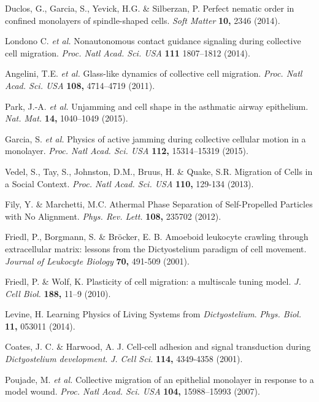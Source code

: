 \documentclass[11pt, twocolumn]{article}
\begin{document}
\begin{thebibliography}{10}
Duclos, G., Garcia, S., Yevick, H.G. \& Silberzan, P. Perfect nematic order in confined monolayers of spindle-shaped cells.
 {\em Soft Matter} \textbf{10,} 2346 (2014).

Londono C. \textit{et al.} Nonautonomous contact guidance signaling during collective cell migration.
 {\em Proc. Natl Acad. Sci. USA} \textbf{111} 1807--1812 (2014).

Angelini, T.E. \textit{et al.} Glass-like dynamics of collective cell migration.
 {\em Proc. Natl Acad.
Sci. USA} \textbf{108,} 4714--4719 (2011).
 
Park, J.-A. \textit{et al.} Unjamming and cell shape in the asthmatic airway epithelium.
 {\em Nat. Mat.} \textbf{14,} 1040--1049 (2015).

Garcia, S. \textit{et al.} Physics of active jamming during collective cellular motion in a monolayer.
 {\em Proc. Natl Acad. Sci. USA} \textbf{112,} 15314--15319 (2015).

Vedel, S., Tay, S., Johnston, D.M., Bruus, H. \& Quake, S.R. Migration of Cells in a Social Context.
 \emph{Proc. Natl Acad. Sci. USA} \textbf{110,} 129-134 (2013).

Fily, Y. \& Marchetti, M.C. Athermal Phase Separation of Self-Propelled Particles with No Alignment.
 \emph{Phys. Rev. Lett.} \textbf{108,} 235702 (2012).

Friedl, P., Borgmann, S. \& Br\"ocker, E. B. Amoeboid leukocyte crawling through extracellular matrix: lessons from the Dictyostelium paradigm of cell movement.
 {\em Journal of Leukocyte Biology} \textbf{70,} 491-509 (2001). 

Friedl, P. \& Wolf, K. Plasticity of cell migration: a multiscale tuning model. {\em J. Cell Biol.} \textbf{188,} 11--9 (2010).

Levine, H. Learning Physics of Living Systems from {\it Dictyostelium}.
 {\em Phys. Biol.} \textbf{11,} 053011 (2014).

Coates, J. C. \& Harwood, A. J. Cell-cell adhesion and signal transduction during {\it Dictyostelium development}.
 {\em J. Cell Sci.} \textbf{114,} 4349-4358 (2001).

Poujade, M. \textit{et al.} Collective migration of an epithelial monolayer in response to a model wound.
 {\em Proc. Natl Acad. Sci. USA} \textbf{104,} 15988--15993 (2007).


\end{thebibliography}
\end{document}
